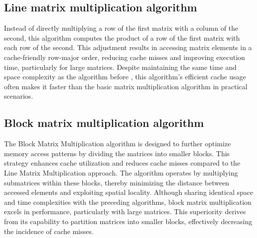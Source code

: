 \subsection{Line matrix multiplication algorithm}

Instead of directly multiplying a row of the 
first matrix with a column of the second, this algorithm
computes the product of a row of the first 
matrix with each row of the second. This 
adjustment results in accessing matrix 
elements in a cache-friendly row-major 
order, reducing cache misses and improving 
execution time, particularly for large matrices. 
Despite maintaining the same time and space complexity as the algorithm before
, this algorithm's 
efficient cache usage often makes it 
faster than the basic matrix multiplication 
algorithm in practical scenarios.


\subsection{Block matrix multiplication algorithm}

The Block Matrix Multiplication algorithm is designed 
to further optimize memory access patterns by dividing 
the matrices into smaller blocks. This strategy enhances 
cache utilization and reduces cache misses compared to the 
Line Matrix Multiplication approach. The algorithm operates by 
multiplying submatrices 
within these blocks, thereby minimizing the distance between 
accessed elements and exploiting spatial locality. Although 
sharing identical space and time complexities with the preceding 
algorithms, block matrix multiplication excels in performance, 
particularly with large matrices. This superiority derives from its 
capability to partition matrices into smaller blocks, effectively 
decreasing the incidence of cache misses.